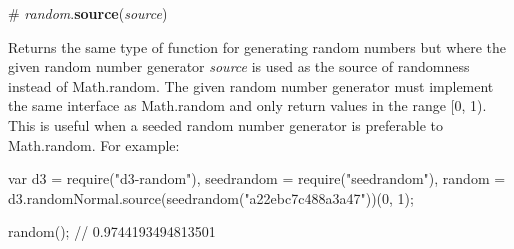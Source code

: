 \label{_random_source}%
\# {\itshape random}.{\bfseries source}({\itshape source})

Returns the same type of function for generating random numbers but where the given random number generator {\itshape source} is used as the source of randomness instead of Math.\+random. The given random number generator must implement the same interface as Math.\+random and only return values in the range \mbox{[}0, 1). This is useful when a seeded random number generator is preferable to Math.\+random. For example\+:


\begin{DoxyCode}
var d3 = require("d3-random"),
    seedrandom = require("seedrandom"),
    random = d3.randomNormal.source(seedrandom("a22ebc7c488a3a47"))(0, 1);

random(); // 0.9744193494813501
\end{DoxyCode}
 